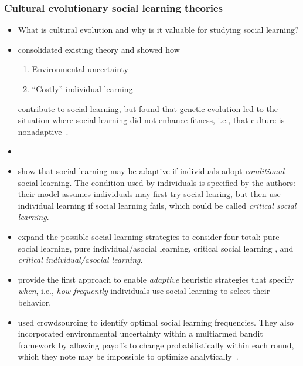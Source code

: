 \documentclass[10pt,letterpaper]{article}
\begin{document}
    \subsubsection{Cultural evolutionary social learning theories}
    \begin{itemize}
      \item
        What is cultural evolution and why is it valuable for studying social
        learning?
      \item 
         consolidated existing theory and showed how 
          \begin{enumerate}
            \item 
              Environmental uncertainty
            \item
              ``Costly'' individual learning 
          \end{enumerate}
        contribute to social learning, but found that genetic evolution led to
        the situation where social learning did not enhance fitness, i.e.,
        that culture is nonadaptive~\cite{Enquist2007}.

      \item
         
        
      \item
         show that social learning may be adaptive if
        individuals adopt \emph{conditional} social
        learning. The condition used by individuals is specified by the
        authors: their model assumes individuals may first try social learing,
        but then use individual learning if social learning fails, which could
        be called \emph{critical social learning}. 
      \item
         expand the possible social learning strategies to
        consider four total: pure social learning, pure individual/asocial
        learning, critical social learning \cite{Enquist2007}, and
        \emph{critical individual/asocial learning}. 
      \item
         provide the first approach to enable
        \emph{adaptive} heuristic strategies that specify \emph{when}, i.e.,
        \emph{how frequently} individuals use social learning to select their
        behavior.
      \item
         used crowdsourcing to identify optimal social
        learning frequencies. They also incorporated environmental uncertainty
        within a multiarmed bandit framework by allowing payoffs to change
        probabilistically within each round, which they note may be impossible to
        optimize analytically~\cite{Papadimitriou1999}.
    \end{itemize}
\end{document}
